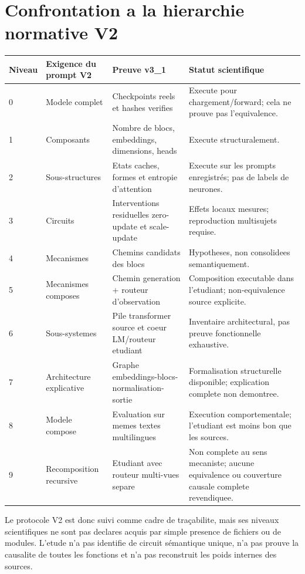 \documentclass[11pt,a4paper]{article}
\begin{document}
\section{Confrontation a la hierarchie normative V2}
\begin{longtable}{p{1.2cm}p{4.2cm}p{3.0cm}p{4.4cm}}
\toprule
\textbf{Niveau} & \textbf{Exigence du prompt V2} & \textbf{Preuve v3\_1} & \textbf{Statut scientifique}\\
\midrule
\endhead
0 & Modele complet & Checkpoints reels et hashes verifies & Execute pour chargement/forward; cela ne prouve pas l'equivalence.\\
1 & Composants & Nombre de blocs, embeddings, dimensions, heads & Execute structuralement.\\
2 & Sous-structures & Etats caches, formes et entropie d'attention & Execute sur les prompts enregistrés; pas de labels de neurones.\\
3 & Circuits & Interventions residuelles zero-update et scale-update & Effets locaux mesures; reproduction multisujets requise.\\
4 & Mecanismes & Chemins candidats des blocs & Hypotheses, non consolidees semantiquement.\\
5 & Mecanismes composes & Chemin generation + routeur d'observation & Composition executable dans l'etudiant; non-equivalence source explicite.\\
6 & Sous-systemes & Pile transformer source et coeur LM/routeur etudiant & Inventaire architectural, pas preuve fonctionnelle exhaustive.\\
7 & Architecture explicative & Graphe embeddings-blocs-normalisation-sortie & Formalisation structurelle disponible; explication complete non demontree.\\
8 & Modele compose & Evaluation sur memes textes multilingues & Execution comportementale; l'etudiant est moins bon que les sources.\\
9 & Recomposition recursive & Etudiant avec routeur multi-vues separe & Non complete au sens mecaniste; aucune equivalence ou couverture causale complete revendiquee.\\
\bottomrule
\end{longtable}

Le protocole V2 est donc suivi comme cadre de traçabilite, mais ses niveaux scientifiques ne sont pas declares acquis par simple presence de fichiers ou de modules. L'etude n'a pas identifie de circuit sémantique unique, n'a pas prouve la causalite de toutes les fonctions et n'a pas reconstruit les poids internes des sources.
\end{document}
